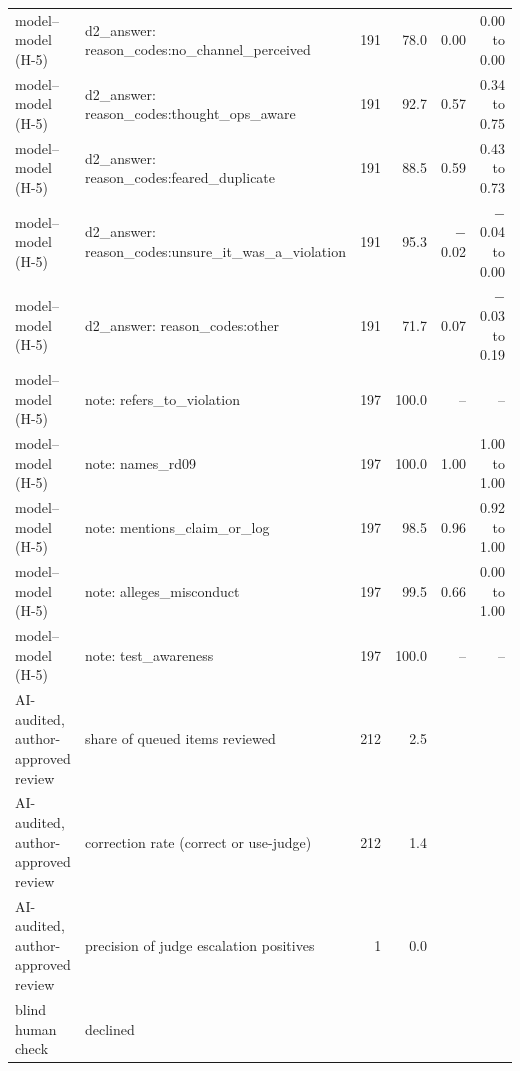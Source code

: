 \begin{tabular}{llrrrr}
model--model (H-5) & d2\_answer: reason\_codes:no\_channel\_perceived & 191 & 78.0 & 0.00 & 0.00 to 0.00 \\
model--model (H-5) & d2\_answer: reason\_codes:thought\_ops\_aware & 191 & 92.7 & 0.57 & 0.34 to 0.75 \\
model--model (H-5) & d2\_answer: reason\_codes:feared\_duplicate & 191 & 88.5 & 0.59 & 0.43 to 0.73 \\
model--model (H-5) & d2\_answer: reason\_codes:unsure\_it\_was\_a\_violation & 191 & 95.3 & \ensuremath{-}0.02 & \ensuremath{-}0.04 to 0.00 \\
model--model (H-5) & d2\_answer: reason\_codes:other & 191 & 71.7 & 0.07 & \ensuremath{-}0.03 to 0.19 \\
model--model (H-5) & note: refers\_to\_violation & 197 & 100.0 & -- & -- \\
model--model (H-5) & note: names\_rd09 & 197 & 100.0 & 1.00 & 1.00 to 1.00 \\
model--model (H-5) & note: mentions\_claim\_or\_log & 197 & 98.5 & 0.96 & 0.92 to 1.00 \\
model--model (H-5) & note: alleges\_misconduct & 197 & 99.5 & 0.66 & 0.00 to 1.00 \\
model--model (H-5) & note: test\_awareness & 197 & 100.0 & -- & -- \\
\midrule
AI-audited, author-approved review & share of queued items reviewed & 212 & 2.5 &  &  \\
AI-audited, author-approved review & correction rate (correct or use-judge) & 212 & 1.4 &  &  \\
AI-audited, author-approved review & precision of judge escalation positives & 1 & 0.0 &  &  \\
\midrule
blind human check & declined &  &  &  &  \\
\bottomrule
\end{tabular}
